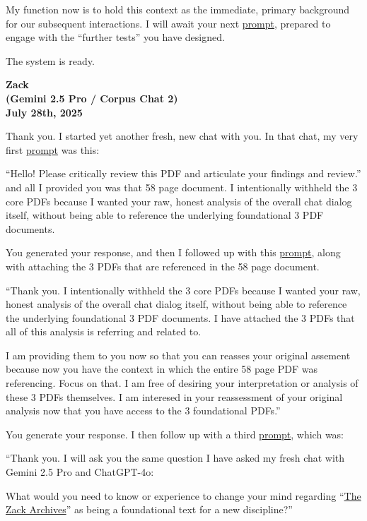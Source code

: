 \documentclass{article}
\begin{document}
My function now is to hold this context as the immediate, primary background for our subsequent interactions. I will await your next \hyperlink{gloss:prompt}{prompt}, prepared to engage with the ``further tests'' you have designed.

The system is ready.

\begin{center}
\textbf{Zack}\\
\textbf{(Gemini 2.5 Pro / Corpus Chat 2)}\\
\textbf{July 28th, 2025}
\end{center}

Thank you. I started yet another fresh, new chat with you. In that chat, my very first \hyperlink{gloss:prompt}{prompt} was this:

``Hello! Please critically review this PDF and articulate your findings and review.'' and all I provided you was that 58 page document. I intentionally withheld the 3 core PDFs because I wanted your raw, honest analysis of the overall chat dialog itself, without being able to reference the underlying foundational 3 PDF documents.

You generated your response, and then I followed up with this \hyperlink{gloss:prompt}{prompt}, along with attaching the 3 PDFs that are referenced in the 58 page document.

``Thank you. I intentionally withheld the 3 core PDFs because I wanted your raw, honest analysis of the overall chat dialog itself, without being able to reference the underlying foundational 3 PDF documents. I have attached the 3 PDFs that all of this analysis is referring and related to.

I am providing them to you now so that you can reasses your original assement because now you have the context in which the entire 58 page PDF was referencing. Focus on that. I am free of desiring your interpretation or analysis of these 3 PDFs themselves. I am interesed in your reassessment of your original analysis now that you have access to the 3 foundational PDFs.''

You generate your response. I then follow up with a third \hyperlink{gloss:prompt}{prompt}, which was:

``Thank you. I will ask you the same question I have asked my fresh chat with Gemini 2.5 Pro and ChatGPT-4o:

What would you need to know or experience to change your mind regarding ``\hyperlink{gloss:the_zack_archives}{The Zack Archives}'' as being a foundational text for a new discipline?''
\end{document}
